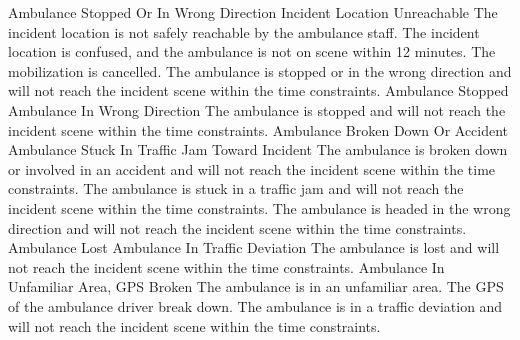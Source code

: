 	 {Ambulance Stopped Or In Wrong Direction}
	 {Incident Location Unreachable}
\stopkaosspec
\startkaosspec
	 {The incident location is not safely reachable by the ambulance staff.}
\stopkaosspec
\startkaosspec
	 {The incident location is confused, and the ambulance is not on scene within 12 minutes.}
\stopkaosspec
\startkaosspec
	 {The mobilization is cancelled.}
\stopkaosspec
\startkaosspec
	 {The ambulance is stopped or in the wrong direction and will not reach the incident scene within the time constraints.}
	 {Ambulance Stopped}
	 {Ambulance In Wrong Direction}
\stopkaosspec
\startkaosspec
	 {The ambulance is stopped and will not reach the incident scene within the time constraints.}
	 {Ambulance Broken Down Or Accident}
	 {Ambulance Stuck In Traffic Jam Toward Incident}
\stopkaosspec
\startkaosspec
	 {The ambulance is broken down or involved in an accident and will not reach the incident scene within the time constraints.}
\stopkaosspec
\startkaosspec
	 {The ambulance is stuck in a traffic jam and will not reach the incident scene within the time constraints.}
\stopkaosspec
\startkaosspec
	 {The ambulance is headed in the wrong direction and will not reach the incident scene within the time constraints.}
	 {Ambulance Lost}
	 {Ambulance In Traffic Deviation}
\stopkaosspec
\startkaosspec
	 {The ambulance is lost and will not reach the incident scene within the time constraints.}
	 {Ambulance In Unfamiliar Area, GPS Broken}
\stopkaosspec
\startkaosspec
	 {The ambulance is in an unfamiliar area.}
\stopkaosspec
\startkaosspec
	 {The GPS of the ambulance driver break down.}
\stopkaosspec
\startkaosspec
	 {The ambulance is in a traffic deviation and will not reach the incident scene within the time constraints.}

